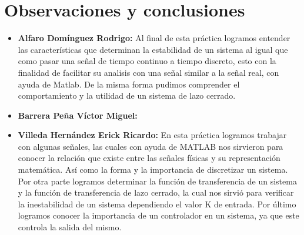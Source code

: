 \section{Observaciones y conclusiones}

\begin{itemize}
	\item \textbf{Alfaro Domínguez Rodrigo:}
	Al final de esta práctica logramos entender las características que determinan la estabilidad de un sistema al igual que como pasar una señal de tiempo continuo a tiempo discreto, esto con la finalidad de facilitar su analisis con una señal similar a la señal real, con ayuda de Matlab. De la misma forma pudimos comprender el comportamiento y la utilidad de un sistema de lazo cerrado.
	\item \textbf{Barrera Peña Víctor Miguel:} 
	\item \textbf{Villeda Hernández Erick Ricardo:}
	En esta práctica logramos trabajar con algunas señales, las cuales con ayuda de MATLAB nos sirvieron para conocer la relación que existe entre las señales físicas  y su representación matemática. Así como la forma y la importancia de discretizar un sistema. Por otra parte logramos determinar la función de transferencia de un sistema y la función de transferencia de lazo cerrado, la cual nos sirvió para verificar la inestabilidad de un sistema dependiendo el valor K de entrada. Por último logramos conocer la importancia de un controlador en un sistema, ya que este controla la salida del mismo.

	
\end{itemize}